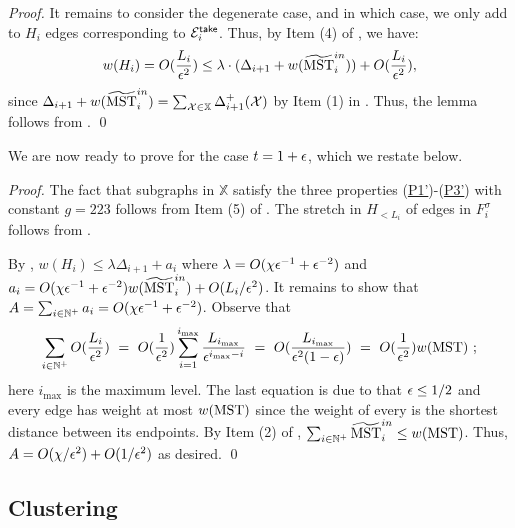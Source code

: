 \begin{proof}
	
	It remains to consider the degenerate case, and in which case, we only add to $H_i$ edges corresponding to $\mathcal{E}^{\mathsf{take}}_i$. Thus, by Item (4) of , we have:
	\begin{equation}\label{eq:Hi-degenT1E}
		w(H_i) = O(\frac{L_i}{\epsilon^2}) \leq  \lambda\cdot (\Delta_{i+1} + w(\widetilde{\mathrm{MST}}^{in}_i)) + O(\frac{L_i}{\epsilon^2}), 
	\end{equation} 
	since $\Delta_{i+1} + w(\widetilde{\mathrm{MST}}^{in}_i) = \sum_{\mathcal{X}\in \mathbb{X}}\Delta^+_{i+1}(\mathcal{X})$ by Item (1) in . Thus, the lemma follows from . \qed
\end{proof}

We are now ready to prove  for the case $t = 1+\epsilon$, which we restate below.

\HiConstruction*
\begin{proof} The fact that subgraphs in $\mathbb{X}$ satisfy the three properties (\hyperlink{P1'}{P1'})-(\hyperlink{P3'}{P3'}) with constant $g=223$ follows from Item (5) of .  The stretch in $H_{< L_i}$ of edges in $F^{\sigma}_{i}$ follows from .

	By  , $w(H_i) \leq \lambda \Delta_{i+1} + a_i$ where  $\lambda = O(\chi \epsilon^{-1} +\epsilon^{-2})$  and $a_i =   O(\chi \epsilon^{-1} + \epsilon^{-2})w(\widetilde{\mathrm{MST}}^{in}_i) + O(L_i/\epsilon^2)$. It remains to show that $A = \sum_{i\in \mathbb{N}^+}a_i = O(\chi \epsilon^{-1} + \epsilon^{-2})$.  Observe that
	\begin{equation*}
		\sum_{i\in \mathbb{N}^+}O(\frac{L_i}{\epsilon^2}) ~=~  O(\frac{1}{\epsilon^2}) \sum_{i=1}^{i_{\max}} \frac{L_{i_{\max}}}{\epsilon^{i_{\max}-i}} ~=~ O(\frac{L_{i_{\max}}}{\epsilon^2(1-\epsilon)}) ~=~ O(\frac{1}{\epsilon^2}) w(\mathrm{MST})~;
	\end{equation*}
	here $i_{\max}$ is the maximum level. The last equation is due to that $\epsilon \leq 1/2$  and every edge has weight at most $w(\mathrm{MST})$ since the weight of every is the shortest distance between its endpoints. By Item (2) of ,  $\sum_{i\in \mathbb{N}^+} \widetilde{\mathrm{MST}}^{in}_i\leq w(\mathrm{MST})$.  Thus, $A = O(\chi/\epsilon^2) + O(1/\epsilon^2)$ as desired.   \qed
\end{proof}


\subsection{Clustering} \label{subsec:clusteringTE}

